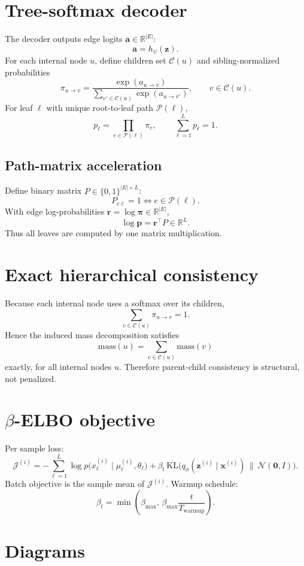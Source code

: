 \documentclass[11pt]{article}
\begin{document}
\section{Tree-softmax decoder}
The decoder outputs edge logits $\bm{a}\in\mathbb{R}^{|E|}$:
\[
\bm{a}=h_\psi(\bm{z}).
\]
For each internal node $u$, define children set $\mathcal{C}(u)$ and sibling-normalized probabilities
\[
\pi_{u\to v}=
\frac{\exp(a_{u\to v})}{\sum_{v'\in\mathcal{C}(u)}\exp(a_{u\to v'})},
\qquad v\in\mathcal{C}(u).
\]
For leaf $\ell$ with unique root-to-leaf path $\mathcal{P}(\ell)$,
\[
p_\ell=\prod_{e\in\mathcal{P}(\ell)}\pi_e,
\qquad
\sum_{\ell=1}^L p_\ell=1.
\]

\subsection*{Path-matrix acceleration}
Define binary matrix $P\in\{0,1\}^{|E|\times L}$:
\[
P_{e\ell}=1\iff e\in\mathcal{P}(\ell).
\]
With edge log-probabilities $\bm{r}=\log\bm{\pi}\in\mathbb{R}^{|E|}$,
\[
\log\bm{p}=\bm{r}^\top P\in\mathbb{R}^L.
\]
Thus all leaves are computed by one matrix multiplication.

\section{Exact hierarchical consistency}
Because each internal node uses a softmax over its children,
\[
\sum_{v\in\mathcal{C}(u)}\pi_{u\to v}=1.
\]
Hence the induced mass decomposition satisfies
\[
\mathrm{mass}(u)=\sum_{v\in\mathcal{C}(u)}\mathrm{mass}(v)
\]
exactly, for all internal nodes $u$. Therefore parent-child consistency is structural, not penalized.

\section{$\beta$-ELBO objective}
Per sample loss:
\[
\mathcal{J}^{(i)}
=-\sum_{\ell=1}^L\log p\big(x_\ell^{(i)}\mid\mu_\ell^{(i)},\theta_\ell\big)
+\beta_t\,\mathrm{KL}\Big(q_\phi(\bm{z}^{(i)}\mid\bm{x}^{(i)})\,\|\,\mathcal{N}(\bm{0},I)\Big).
\]
Batch objective is the sample mean of $\mathcal{J}^{(i)}$.
Warmup schedule:
\[
\beta_t=\min\!\left(\beta_{\max},\,\beta_{\max}\frac{t}{T_{\text{warmup}}}\right).
\]

\section{Diagrams}
\end{document}
